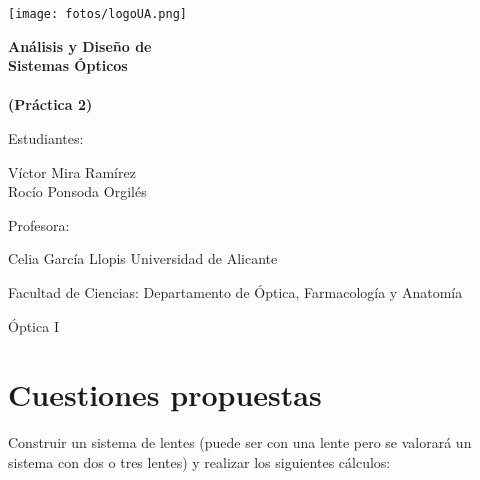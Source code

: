 \documentclass[11pt]{article}
\newcommand{\laputa}[1]{\begin{note}{#1}{}\end{note}}
\newcommand{\titulo}{Análisis y Diseño de\\ Sistemas Ópticos \\\ \\(Práctica 2)}
\newcommand{\nombreestudiante}{Víctor Mira Ramírez\\ Rocío Ponsoda Orgilés}
\newcommand{\nombredirector}{Celia García Llopis}
\newcommand{\fecha}{\date{Diciembre 2023}}
\begin{document}
    \begin{titlepage}
    	\centering
    	\texttt{[image: fotos/logoUA.png]}\par
    	\vspace{1cm}
    	{\huge\bfseries \vspace{15mm} \titulo \par}
    	\vfill
    	{\large 
    	\vfill
    	Estudiantes:\par\vspace{2mm}
    	\nombreestudiante\par
    	\vfill
    	Profesora:\par\vspace{2mm}
        \nombredirector
        \vfill
        Universidad de Alicante\par
        Facultad de Ciencias: Departamento de Óptica, Farmacología y Anatomía\par
        Óptica I\par
    	\fecha\par}
    \end{titlepage}
    
    \clearpage

    \begin{abstract}\label{sec:abstract}
        En esta práctica presentamos una introducción general a los programas de análisis y diseño de elementos ópticos. En concreto nos familiarizaremos con el programa \textit{OSLO EDU} y sus posibilidades más básicas. Construiremos un sistema con dos lentes del cual obtendremos los resultados a las cuestiones propuestas en clase.
    \end{abstract}\vspace{0.3cm}  
    
    \section*{Cuestiones propuestas}

        \laputa{Construir un sistema de lentes (puede ser con una lente pero se valorará un sistema con dos o tres lentes) y realizar los siguientes cálculos:}
\end{document}
